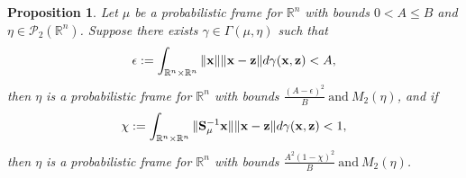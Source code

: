 \documentclass{amsart}
\numberwithin{equation}{section}
\theoremstyle{plain}
\newtheorem{proposition}[theorem]{Proposition}
\theoremstyle{definition}
\begin{document}
\begin{proposition}\label{CoulingDualPerturbation}
Let $\mu$ be a probabilistic frame for $\mathbb{R}^n$ with bounds $0<A \leq B$ and $\eta \in \mathcal{P}_2(\mathbb{R}^n)$. Suppose there exists $\gamma \in \Gamma(\mu, \eta)$ such that
\begin{equation*}
   \epsilon:= \int_{\mathbb{R}^n \times \mathbb{R}^n}  \Vert {\bf x}\Vert  \Vert {\bf x}-{\bf z} \Vert  d \gamma({\bf x},{\bf z})<A,
\end{equation*}
then $\eta$ is a probabilistic frame for $\mathbb{R}^n$ with bounds $\frac{(A- \epsilon)^2}{B} \ \text{and} \ M_2(\eta)$,
and if 
\begin{equation*}
   \chi := \int_{\mathbb{R}^n \times \mathbb{R}^n} \Vert {\bf S}_\mu^{-1} {\bf x}\Vert   \Vert {\bf x}-{\bf z} \Vert  d \gamma({\bf x},{\bf z})<1,
\end{equation*}
then $\eta$ is a probabilistic frame for $\mathbb{R}^n$ with bounds $\frac{A^2 (1-\chi)^2}{B} \ \text{and} \ M_2(\eta)$.
\end{proposition}
\end{document}
